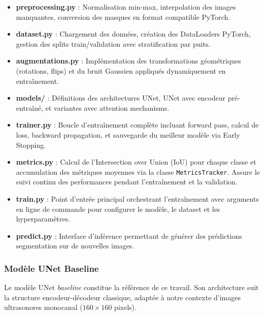 \begin{itemize}
      \item \textbf{preprocessing.py} : Normalisation min-max, interpolation des images manquantes,
            conversion des masques en format compatible PyTorch.

      \item \textbf{dataset.py} : Chargement des données, création des DataLoaders PyTorch,
            gestion des splits train/validation avec stratification par puits.

      \item \textbf{augmentations.py} : Implémentation des transformations géométriques
            (rotations, flips) et du bruit Gaussien appliqués dynamiquement en entraînement.

      \item \textbf{models/} : Définitions des architectures UNet, UNet avec encodeur pré-entraîné,
            et variantes avec attention mechanisms.

      \item \textbf{trainer.py} : Boucle d'entraînement complète incluant forward pass,
            calcul de loss, backward propagation, et sauvegarde du meilleur modèle via Early Stopping.

      \item \textbf{metrics.py} : Calcul de l'Intersection over Union (IoU) pour chaque classe
            et accumulation des métriques moyennes via la classe \texttt{MetricsTracker}.
            Assure le suivi continu des performances pendant l'entraînement et la validation.

      \item \textbf{train.py} : Point d'entrée principal orchestrant l'entraînement avec
            arguments en ligne de commande pour configurer le modèle, le dataset et les hyperparamètres.

      \item \textbf{predict.py} : Interface d'inférence permettant de générer des prédictions
            segmentation sur de nouvelles images.
\end{itemize}

\subsubsection{Modèle UNet Baseline}

Le modèle UNet \textit{baseline} constitue la référence de ce travail. Son architecture
suit la structure encodeur-décodeur classique, adaptée
à notre contexte d'images ultrasonores monocanal ($160 \times 160$ pixels).

